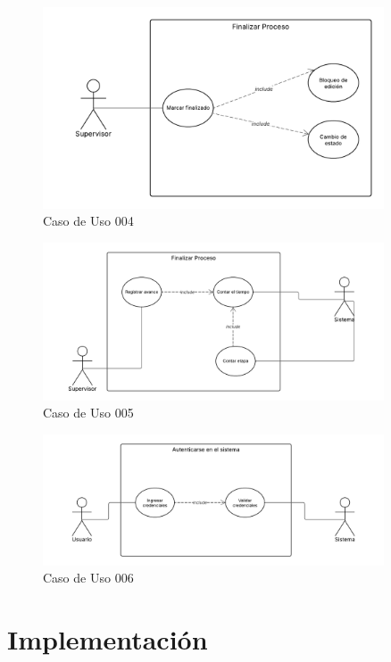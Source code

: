 \documentclass[12pt,letterpaper,spanish]{report}
\begin{document}
\begin{figure}[htp]
  \centering
  \includegraphics[width=0.9\textwidth]{DIACU04.png}
  \caption{Caso de Uso 004}\label{d04}
\end{figure}

\begin{figure}[htp]
  \centering
  \includegraphics[width=0.9\textwidth]{DIACU05.png}
  \caption{Caso de Uso 005}\label{d05}
\end{figure}

\begin{figure}[htp]
  \centering
  \includegraphics[width=0.9\textwidth]{DIACU06.png}
  \caption{Caso de Uso 006}\label{d06}
\end{figure}

\section{Implementación}
\end{document}
